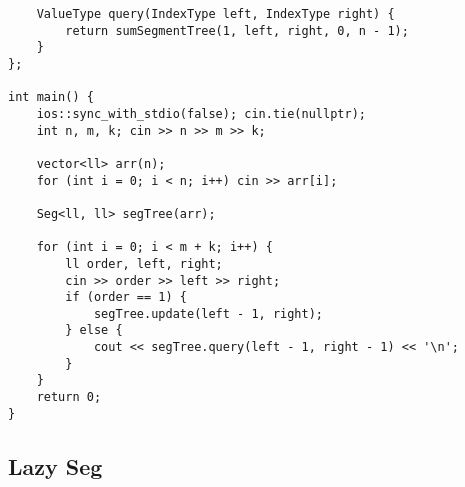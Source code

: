 \documentclass[landscape, 8pt, a4paper, oneside, twocolumn]{extarticle}
\begin{document}
\begin{verbatim}
    ValueType query(IndexType left, IndexType right) {
        return sumSegmentTree(1, left, right, 0, n - 1);
    }
};

int main() {
    ios::sync_with_stdio(false); cin.tie(nullptr);
    int n, m, k; cin >> n >> m >> k;

    vector<ll> arr(n);
    for (int i = 0; i < n; i++) cin >> arr[i];

    Seg<ll, ll> segTree(arr);

    for (int i = 0; i < m + k; i++) {
        ll order, left, right;
        cin >> order >> left >> right;
        if (order == 1) {
            segTree.update(left - 1, right);
        } else {
            cout << segTree.query(left - 1, right - 1) << '\n';
        }
    }
    return 0;
}
    \end{verbatim}
    \subsection{Lazy Seg}
\end{document}

